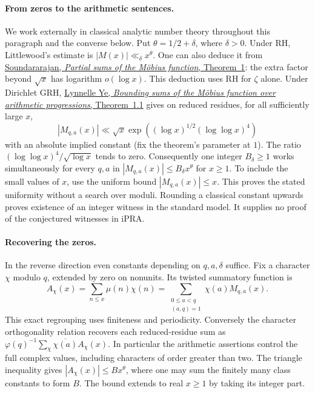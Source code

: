 \paragraph{From zeros to the arithmetic sentences.}
We work externally in classical analytic number theory throughout this
paragraph and the converse below. Put $\theta=1/2+\delta$, where
$\delta>0$. Under RH, Littlewood's estimate is $|M(x)|\ll_\delta
x^\theta$. One can also deduce it from
\href{https://arxiv.org/abs/0705.0723}{Soundararajan, \emph{Partial sums
of the M\"obius function}, Theorem~1}: the extra factor beyond
$\sqrt{x}$ has logarithm $o(\log x)$. This deduction uses RH for
$\zeta$ alone. Under Dirichlet GRH,
\href{https://arxiv.org/abs/1406.7326}{Lynnelle Ye, \emph{Bounding sums
of the M\"obius function over arithmetic progressions}, Theorem~1.1}
gives on reduced residues, for all sufficiently large $x$,
\[
 |M_{q,a}(x)|\ll \sqrt{x}
 \exp\!\left((\log x)^{1/2}(\log\log x)^4\right)
\]
with an absolute implied constant (fix the theorem's parameter at $1$).
The ratio $(\log\log x)^4/\sqrt{\log x}$ tends to zero. Consequently
one integer $B_\delta\geq1$ works simultaneously for every $q,a$ in
$|M_{q,a}(x)|\leq B_\delta x^\theta$ for $x\geq1$. To include the
small values of $x$, use the uniform bound $|M_{q,a}(x)|\leq x$.
This proves the stated uniformity without a search over moduli.
Rounding a classical constant upwards proves existence of an integer
witness in the standard model. It supplies no proof of the conjectured
witnesses in iPRA.

\paragraph{Recovering the zeros.}
In the reverse direction even constants depending on $q,a,\delta$
suffice. Fix a character $\chi$ modulo $q$, extended by zero on
nonunits. Its twisted summatory function is
\[
 A_\chi(x)=\sum_{n\leq x}\mu(n)\chi(n)
 =\sum_{\substack{0\leq a<q\\(a,q)=1}}\chi(a)M_{q,a}(x).
\]
This exact regrouping uses finiteness and periodicity. Conversely the
character orthogonality relation recovers each reduced-residue sum as
$\varphi(q)^{-1}\sum_\chi\overline{\chi(a)}A_\chi(x)$.
In particular the arithmetic assertions control the full complex values,
including characters of order greater than two. The triangle inequality
gives $|A_\chi(x)|\leq B x^\theta$, where one may sum the finitely many
class constants to form $B$. The bound extends to real $x\geq1$ by
taking its integer part.


